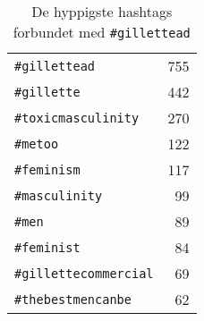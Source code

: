 \begin{table}[!h]
\centering
\captionsetup{justification=centering,singlelinecheck=off}
\caption{De hyppigste hashtags forbundet med \texttt{#gillettead}}
\begin{tabular}{lr}

\texttt{\#gillettead}         & 755 \\
\texttt{\#gillette}           & 442 \\
\texttt{\#toxicmasculinity}   & 270 \\
\texttt{\#metoo}              & 122 \\
\texttt{\#feminism}           & 117\\
\texttt{\#masculinity}        & 99 \\
\texttt{\#men}                & 89 \\
\texttt{\#feminist}           & 84 \\
\texttt{\#gillettecommercial} & 69 \\
\texttt{\#thebestmencanbe}    & 62
\end{tabular}

\end{table}
